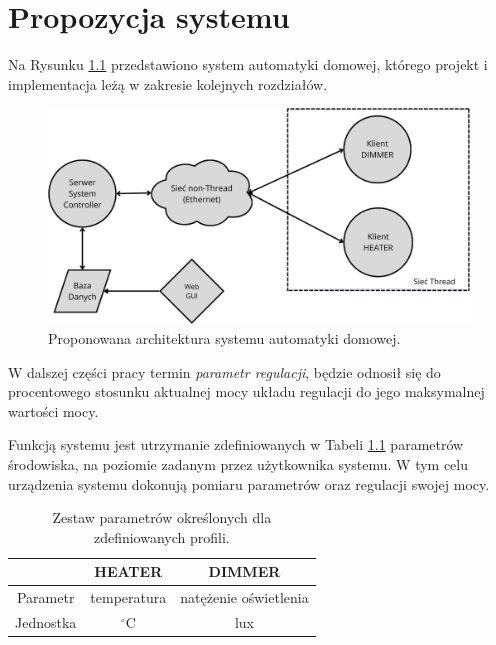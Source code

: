 \chapter{Propozycja systemu}
\label{cha:propozycja-systemu}

Na Rysunku \ref{fig:system-architecture} przedstawiono system automatyki domowej, którego projekt i implementacja leżą w zakresie kolejnych rozdziałów.

\begin{figure}[H]
    \centering
    \includegraphics[width=0.8\linewidth]{graphics/system-architecture.png}
    \caption{Proponowana architektura systemu automatyki domowej.}
    \label{fig:system-architecture}
\end{figure}

W dalszej części pracy termin \textit{parametr regulacji}, będzie odnosił się do procentowego stosunku aktualnej mocy układu regulacji do jego maksymalnej wartości mocy.

Funkcją systemu jest utrzymanie zdefiniowanych w Tabeli \ref{tab:profiles-parameters} parametrów środowiska, na poziomie zadanym przez użytkownika systemu. W tym celu urządzenia systemu dokonują pomiaru parametrów oraz regulacji swojej mocy.

\begin{table}[H]
    \centering
    \caption{Zestaw parametrów określonych dla zdefiniowanych profili.}
    \begin{tabular}{|c|c|c|}
         \hline
         \rowcolor{gray!20}
          & HEATER & DIMMER \\
         \hline
         \cellcolor{gray!20}Parametr & temperatura & natężenie oświetlenia \\
         \hline
         \cellcolor{gray!20}Jednostka & $^{\circ}$C & lux \\
         \hline
    \end{tabular}
    \label{tab:profiles-parameters}
\end{table}

